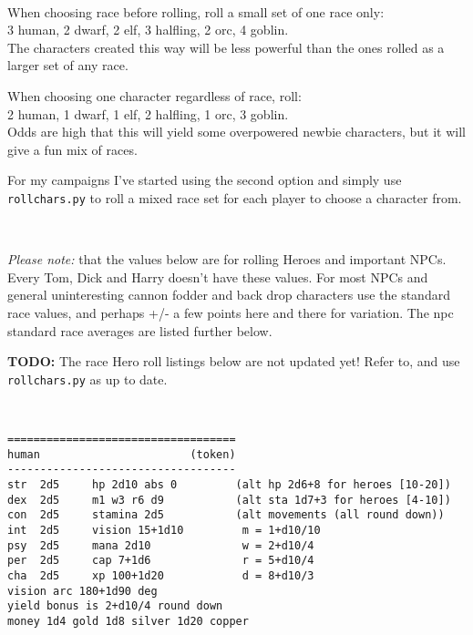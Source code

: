 \

When choosing race before rolling, roll a small set of one race only:\\
3 human, 2 dwarf, 2 elf, 3 halfling, 2 orc, 4 goblin.\\
The characters created this way will be less powerful than the ones rolled as a larger set of any race.

When choosing one character regardless of race, roll:\\
2 human, 1 dwarf, 1 elf, 2 halfling, 1 orc, 3 goblin.\\
Odds are high that this will yield some overpowered newbie characters, but it will give a fun mix of races.

For my campaigns I've started using the second option and simply use \verb|rollchars.py| to roll a mixed race set for each player to choose a character from.

\

\emph{Please note:} that the values below are for rolling Heroes and important NPCs. Every Tom, Dick and Harry doesn't have these values. For most NPCs and general uninteresting cannon fodder and back drop characters use the standard race values, and perhaps +/- a few points here and there for variation. The npc standard race averages are listed further below.



\textbf{TODO:} The race Hero roll listings below are not updated yet! Refer to, and use \verb|rollchars.py| as up to date.

\

\small \begin{samepage} \begin{verbatim}
===================================
human                       (token)
-----------------------------------
str  2d5     hp 2d10 abs 0         (alt hp 2d6+8 for heroes [10-20])
dex  2d5     m1 w3 r6 d9           (alt sta 1d7+3 for heroes [4-10])
con  2d5     stamina 2d5           (alt movements (all round down))
int  2d5     vision 15+1d10         m = 1+d10/10
psy  2d5     mana 2d10              w = 2+d10/4
per  2d5     cap 7+1d6              r = 5+d10/4
cha  2d5     xp 100+1d20            d = 8+d10/3
vision arc 180+1d90 deg
yield bonus is 2+d10/4 round down
money 1d4 gold 1d8 silver 1d20 copper
\end{verbatim} \end{samepage}

